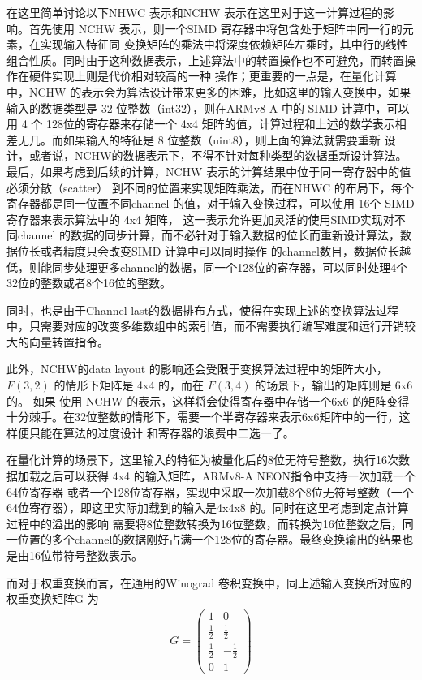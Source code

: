 在这里简单讨论以下NHWC 表示和NCHW 表示在这里对于这一计算过程的影响。首先使用 NCHW 表示，则一个SIMD 寄存器中将包含处于矩阵中同一行的元素，在实现输入特征同
变换矩阵的乘法中将深度依赖矩阵左乘时，其中行的线性组合性质。同时由于这种数据表示，上述算法中的转置操作也不可避免，而转置操作在硬件实现上则是代价相对较高的一种
操作；更重要的一点是，在量化计算中，NCHW 的表示会为算法设计带来更多的困难，比如这里的输入变换中，如果输入的数据类型是 32 位整数（int32），则在ARMv8-A 中的
SIMD 计算中，可以用 4 个 128位的寄存器来存储一个 4x4 矩阵的值，计算过程和上述的数学表示相差无几。而如果输入的特征是 8 位整数（uint8），则上面的算法就需要重新
设计，或者说，NCHW的数据表示下，不得不针对每种类型的数据重新设计算法。最后，如果考虑到后续的计算，NCHW 表示的计算结果中位于同一寄存器中的值必须分散（scatter）
到不同的位置来实现矩阵乘法，而在NHWC 的布局下，每个寄存器都是同一位置不同channel 的值，对于输入变换过程，可以使用  16个 SIMD 寄存器来表示算法中的 4x4 矩阵，
这一表示允许更加灵活的使用SIMD实现对不同channel 的数据的同步计算，而不必针对于输入数据的位长而重新设计算法，数据位长或者精度只会改变SIMD 计算中可以同时操作
的channel数目，数据位长越低，则能同步处理更多channel的数据，同一个128位的寄存器，可以同时处理4个32位的整数或者8个16位的整数。 

同时，也是由于Channel last的数据排布方式，使得在实现上述的变换算法过程中，只需要对应的改变多维数组中的索引值，而不需要执行编写难度和运行开销较大的向量转置指令。

此外，NCHW的data layout 的影响还会受限于变换算法过程中的矩阵大小，$F(3, 2)$ 的情形下矩阵是 4x4 的，而在 $F(3, 4)$ 的场景下，输出的矩阵则是 6x6 的。  如果
使用 NCHW 的表示，这样将会使得寄存器中存储一个6x6 的矩阵变得十分棘手。在32位整数的情形下，需要一个半寄存器来表示6x6矩阵中的一行，这样便只能在算法的过度设计
和寄存器的浪费中二选一了。

在量化计算的场景下，这里输入的特征为被量化后的8位无符号整数，执行16次数据加载之后可以获得 4x4 的输入矩阵，ARMv8-A NEON指令中支持一次加载一个64位寄存器
或者一个128位寄存器，实现中采取一次加载8个8位无符号整数（一个64位寄存器），即这里实际加载到的输入是4x4x8 的。同时在这里考虑到定点计算过程中的溢出的影响
需要将8位整数转换为16位整数，而转换为16位整数之后，同一位置的多个channel的数据刚好占满一个128位的寄存器。最终变换输出的结果也是由16位带符号整数表示。

而对于权重变换而言，在通用的Winograd 卷积变换中，同上述输入变换所对应的权重变换矩阵G 为 
\begin{align}
G = 
\begin{pmatrix}
  1 & 0 \\
  \frac{1}{2} & \frac{1}{2} \\
  \frac{1}{2} & -\frac{1}{2} \\
  0 & 1
\end{pmatrix}
\end{align}

